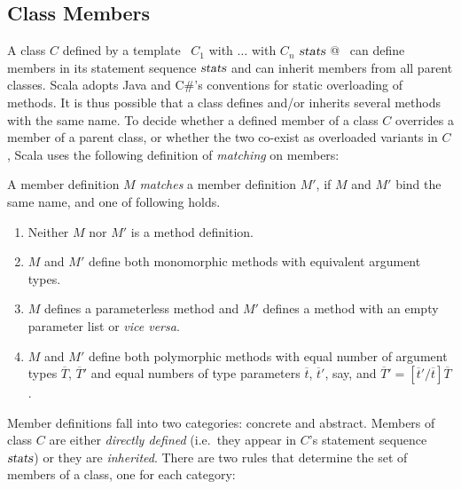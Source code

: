 \subsection{Class Members}
\label{sec:members}

A class $C$ defined by a template 
~\lstinline@$C_1$ with $\ldots$ with $C_n$ { $\mbox{\sl stats}$ }@~ 
can define members in its statement sequence
$\mbox{\sl stats}$ and can inherit members from all parent classes.  Scala
adopts Java and C\#'s conventions for static overloading of
methods. It is thus possible that a class defines and/or inherits
several methods with the same name.  To decide whether a defined
member of a class $C$ overrides a member of a parent class, or whether
the two co-exist as overloaded variants in $C$, Scala uses the
following definition of {\em matching} on members:

\begin{definition}
A member definition $M$ {\em matches} a member definition $M'$, if $M$
and $M'$ bind the same name, and one of following holds.
\begin{enumerate}
\item Neither $M$ nor $M'$ is a method definition.
\item $M$ and $M'$ define both monomorphic methods with equivalent argument
  types.
\item $M$ defines a parameterless method and $M'$ defines a method
  with an empty parameter list \code{()} or {\em vice versa}. 
\item $M$ and $M'$ define both polymorphic methods with 
equal number of argument types $\overline T$, $\overline T'$
and equal numbers of type parameters
$\overline t$, $\overline t'$, say, and $\overline T' = [\overline t'/\overline t]\overline T$.
\end{enumerate}
\end{definition}
Member definitions fall into two categories: concrete and abstract.
Members of class $C$ are either {\em directly defined} (i.e.\ they appear in
$C$'s statement sequence $\mbox{\sl stats}$) or they are {\em inherited}.  There are two rules
that determine the set of members of a class, one for each category:

